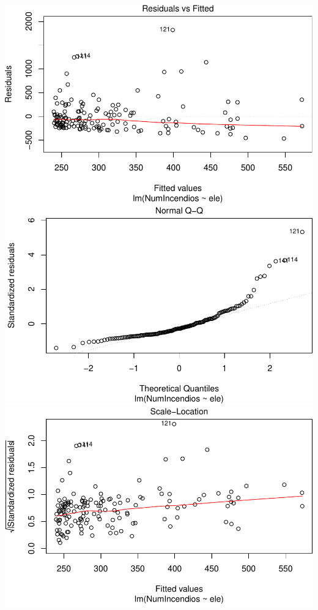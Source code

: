 \documentclass[11pt,]{article}
\begin{document}
\includegraphics{proyecto_files/figure-latex/unnamed-chunk-54-1.pdf}
\includegraphics{proyecto_files/figure-latex/unnamed-chunk-54-2.pdf}
\includegraphics{proyecto_files/figure-latex/unnamed-chunk-54-3.pdf}
\end{document}
